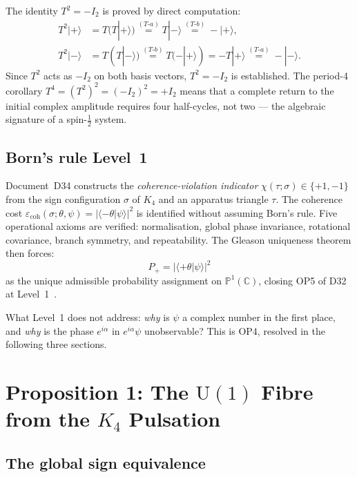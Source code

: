 \documentclass[12pt,a4paper]{article}
\newcommand{\cplu}{|{+}\rangle}
\newcommand{\cmin}{|{-}\rangle}
\newcommand{\CC}{\mathbb{C}}
\newcommand{\PP}{\mathbb{P}}
\begin{document}
The identity $T^2 = -I_2$ is proved by direct computation:
\begin{align}
T^2\cplu &= T(T\cplu) \stackrel{(T\text{-}a)}{=} T\cmin
           \stackrel{(T\text{-}b)}{=} -\cplu, \label{eq:T2plus} \\
T^2\cmin &= T(T\cmin) \stackrel{(T\text{-}b)}{=} T(-\cplu)
           = -T\cplu \stackrel{(T\text{-}a)}{=} -\cmin. \label{eq:T2minus}
\end{align}
Since $T^2$ acts as $-I_2$ on both basis vectors, $T^2 = -I_2$ is established. The
period-4 corollary $T^4 = (T^2)^2 = (-I_2)^2 = +I_2$ means that a complete return
to the initial complex amplitude requires four half-cycles, not two — the algebraic
signature of a spin-$\tfrac{1}{2}$ system.

\subsection{Born's rule Level~1}
\label{subsec:born1}

Document~D34 constructs the \emph{coherence-violation indicator}
$\chi(\tau;\sigma) \in \{+1,-1\}$ from the sign configuration $\sigma$ of $K_4$ and
an apparatus triangle $\tau$. The coherence cost
$\varepsilon_{\mathrm{coh}}(\sigma;\theta,\psi) = |\langle-\theta|\psi\rangle|^2$
is identified without assuming Born's rule. Five operational axioms are verified:
normalisation, global phase invariance, rotational covariance, branch symmetry, and
repeatability. The Gleason uniqueness theorem then forces:
\begin{equation}
P_+ = |\langle+\theta|\psi\rangle|^2
\label{eq:born1}
\end{equation}
as the unique admissible probability assignment on $\PP^1(\CC)$, closing OP5 of D32
at Level~1~\cite{PDL_D34_2026}.

What Level~1 does not address: \emph{why} is $\psi$ a complex number in the first
place, and \emph{why} is the phase $e^{i\alpha}$ in $e^{i\alpha}\psi$ unobservable?
This is OP4, resolved in the following three sections.

\section{Proposition 1: The \texorpdfstring{$\mathrm{U}(1)$}{U(1)} Fibre from the \texorpdfstring{$K_4$}{K4} Pulsation}
\label{sec:U1_fibre}

\subsection{The global sign equivalence}
\end{document}
